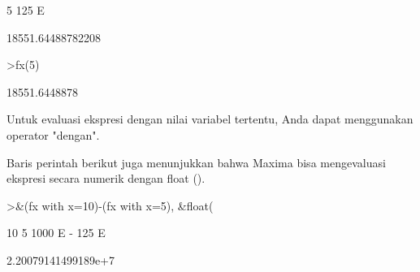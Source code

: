 \documentclass[12pt,arial,letterpaper]{book}
\begin{document}
\begin{eulernootebook}
\begin{eulercomment}
\begin{eulercomment}
\begin{eulernootebook}
\begin{eulercomment}
\begin{eulercomment}
\begin{euleroutput}
                                       5
                                  125 E
  
  
                            18551.64488782208
  
\end{euleroutput}
\begin{eulerprompt}
>fx(5)
\end{eulerprompt}
\begin{euleroutput}
  18551.6448878
\end{euleroutput}
\begin{eulercomment}
Untuk evaluasi ekspresi dengan nilai variabel tertentu, Anda dapat
menggunakan operator "dengan".

Baris perintah berikut juga menunjukkan bahwa Maxima bisa mengevaluasi
ekspresi secara numerik dengan float ().
\end{eulercomment}
\begin{eulerprompt}
>&(fx with x=10)-(fx with x=5), &float(%
\end{eulerprompt}
\begin{euleroutput}
  
                                  10        5
                            1000 E   - 125 E
  
  
                           2.20079141499189e+7
  

\end{euleroutput}
\end{eulercomment}
\end{eulercomment}
\end{eulernootebook}
\end{eulercomment}
\end{eulercomment}
\end{eulernootebook}
\end{document}
